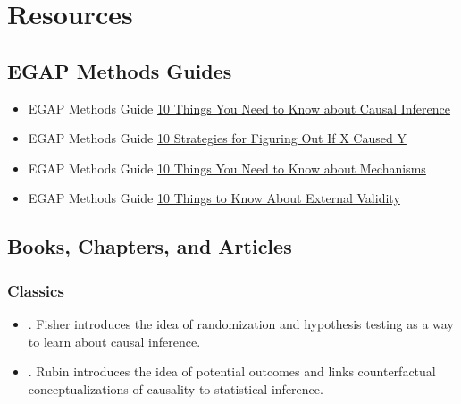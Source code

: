 \documentclass[12pt,]{book}
\begin{document}
\hypertarget{resources-1}{%
\section{Resources}\label{resources-1}}

\hypertarget{egap-methods-guides-1}{%
\subsection{EGAP Methods Guides}\label{egap-methods-guides-1}}

\begin{itemize}
\item
  EGAP Methods Guide \href{https://egap.org/resource/10-things-to-know-about-causal-inference/}{10 Things You Need to Know about Causal Inference}
\item
  EGAP Methods Guide \href{https://egap.org/resource/10-strategies-figuring-out-if-x-caused-y/}{10 Strategies for Figuring Out If X Caused Y}
\item
  EGAP Methods Guide \href{https://egap.org/resource/10-things-mechanisms/}{10 Things You Need to Know about Mechanisms}
\item
  EGAP Methods Guide \href{https://egap.org/resource/10-things-to-know-about-external-validity/}{10 Things to Know About External Validity}
\end{itemize}

\hypertarget{causalinference-cites}{%
\subsection{Books, Chapters, and Articles}\label{causalinference-cites}}

\hypertarget{causalinference-classics}{%
\subsubsection{Classics}\label{causalinference-classics}}

\begin{itemize}
\item
  \autocite{fisher_design_1935}. Fisher introduces the idea of randomization and hypothesis testing as a way to learn about causal inference.
\item
  \autocite{rubin:1974}. Rubin introduces the idea of potential outcomes and links counterfactual conceptualizations of causality to statistical inference.
\end{itemize}
\end{document}
